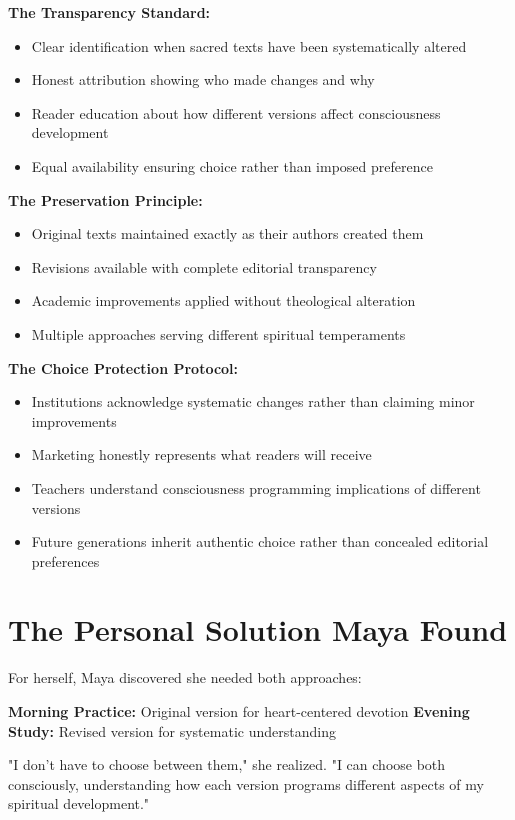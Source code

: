 \documentclass[11pt,twoside]{book}
\begin{document}
\textbf{\textbf{The Transparency Standard:}}
\begin{itemize}
\item Clear identification when sacred texts have been systematically altered
\item Honest attribution showing who made changes and why
\item Reader education about how different versions affect consciousness development
\item Equal availability ensuring choice rather than imposed preference
\end{itemize}

\textbf{\textbf{The Preservation Principle:}}
\begin{itemize}
\item Original texts maintained exactly as their authors created them
\item Revisions available with complete editorial transparency
\item Academic improvements applied without theological alteration
\item Multiple approaches serving different spiritual temperaments
\end{itemize}

\textbf{\textbf{The Choice Protection Protocol:}}
\begin{itemize}
\item Institutions acknowledge systematic changes rather than claiming minor improvements
\item Marketing honestly represents what readers will receive
\item Teachers understand consciousness programming implications of different versions
\item Future generations inherit authentic choice rather than concealed editorial preferences
\end{itemize}
\section*{The Personal Solution Maya Found}
\label{sec:org55c1ab1}

For herself, Maya discovered she needed both approaches:

\textbf{\textbf{Morning Practice:}} Original version for heart-centered devotion
\textbf{\textbf{Evening Study:}} Revised version for systematic understanding

"I don't have to choose between them," she realized. "I can choose both consciously, understanding how each version programs different aspects of my spiritual development."
\end{document}
